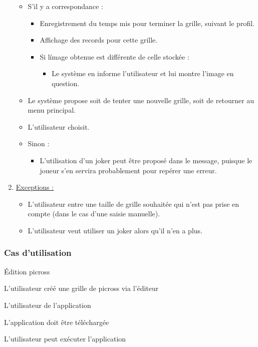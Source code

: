 \documentclass[a4paper, 12pt, twoside]{article}
\begin{document}
\begin{enumerate}
\begin{itemize}
		\item {S'il y a correspondance :}
		\begin{itemize}\setlength{\itemsep}{3mm}
			\item Enregistrement du temps mis pour terminer la grille, suivant le profil.
			\item Affichage des records pour cette grille.
			\item {Si l\'image obtenue est diff\'erente de celle stock\'ee :}
			\begin{itemize}\setlength{\itemsep}{1mm}
				\item Le système en informe l'utilisateur et lui montre l'image en question.\newline
			\end{itemize}					
		\end{itemize}	
		\item Le système propose soit de tenter une nouvelle grille, soit de retourner au menu principal.
		\item L'utilisateur choisit.\newline

		\item {Sinon :}
		\begin{itemize}\setlength{\itemsep}{3mm}
			\item L'utilisation d'un joker peut être proposé dans le message, puisque le joueur s'en servira probablement pour repérer une erreur.
		\end{itemize}			
	\end{itemize}

	\item{\ul{Exceptions :}}\newline
	\begin{itemize}\setlength{\itemsep}{5mm}
		\item L'utilisateur entre une taille de grille souhaitée qui n'est pas prise en compte (dans le cas d'une saisie manuelle).
		\item L'utilisateur veut utiliser un joker alors qu'il n'en a plus.
	\end{itemize}
\end{enumerate}

\subsubsection*{Cas d'utilisation }

\begin{description}\setlength{\itemsep}{0mm}

 \item[Nom :] \'Edition picross 
 \item[Description :] L'utilisateur créé une grille de picross via l'éditeur
 \item[Acteur :] L'utilisateur de l'application 
 \item[Préalables :] L'application doit être téléchargée
 \item[Conséquents :] L'utilisateur peut exécuter l'application\newline
 
\end{description}
\end{document}
